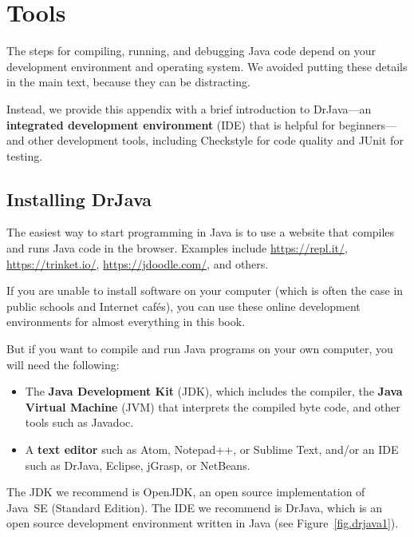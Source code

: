 \chapter{Tools}
\label{tools}


The steps for compiling, running, and debugging Java code depend on your development environment and operating system.
We avoided putting these details in the main text, because they can be distracting.

Instead, we provide this appendix with a brief introduction to DrJava---an {\bf integrated development environment} (IDE) that is helpful for beginners---and other development tools, including Checkstyle for code quality and JUnit for testing.


\section{Installing DrJava}
\label{tools_installing-drjava}

The easiest way to start programming in Java is to use a website that compiles and runs Java code in the browser.
Examples include \url{https://repl.it/}, \url{https://trinket.io/}, \url{https://jdoodle.com/}, and others.

If you are unable to install software on your computer (which is often the case in public schools and Internet caf\'{e}s), you can use these online development environments for almost everything in this book.

But if you want to compile and run Java programs on your own computer, you will need the following:

\begin{itemize}

\item The {\bf Java Development Kit} (JDK), which includes the compiler, the {\bf Java Virtual Machine} (JVM) that interprets the compiled byte code, and other tools such as Javadoc.



\item A {\bf text editor} such as Atom, Notepad++, or Sublime Text, and/or an IDE such as DrJava, Eclipse, jGrasp, or NetBeans.

\end{itemize}

The JDK we recommend is OpenJDK, an open source implementation of Java~SE (Standard Edition).
The IDE we recommend is DrJava, which is an open source development environment written in Java (see Figure~\ref{fig.drjava1}).

